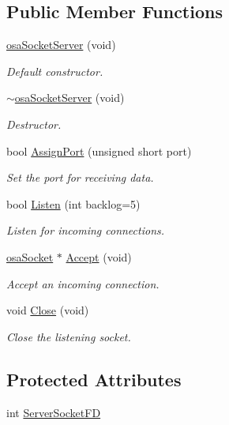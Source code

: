 \subsection*{Public Member Functions}
\begin{DoxyCompactItemize}
\item 
\hyperlink{classosa_socket_server_a95442e75d0234966550256b8591fca55}{osa\-Socket\-Server} (void)
\begin{DoxyCompactList}\small\item\em Default constructor. \end{DoxyCompactList}\item 
\hyperlink{classosa_socket_server_a0e5b5e34967cd0bfe3ee80ba98f62fe5}{$\sim$osa\-Socket\-Server} (void)
\begin{DoxyCompactList}\small\item\em Destructor. \end{DoxyCompactList}\item 
bool \hyperlink{classosa_socket_server_a983f8c04e9683324095f6440d022e7fb}{Assign\-Port} (unsigned short port)
\begin{DoxyCompactList}\small\item\em Set the port for receiving data. \end{DoxyCompactList}\item 
bool \hyperlink{classosa_socket_server_a8a9d065ea83b82acdce8568d0e87610a}{Listen} (int backlog=5)
\begin{DoxyCompactList}\small\item\em Listen for incoming connections. \end{DoxyCompactList}\item 
\hyperlink{classosa_socket}{osa\-Socket} $\ast$ \hyperlink{classosa_socket_server_afb7c054b984fe086617dd17b65b20979}{Accept} (void)
\begin{DoxyCompactList}\small\item\em Accept an incoming connection. \end{DoxyCompactList}\item 
void \hyperlink{classosa_socket_server_aa3540c4c8fccdddde8b1b922bbb4dbba}{Close} (void)
\begin{DoxyCompactList}\small\item\em Close the listening socket. \end{DoxyCompactList}\end{DoxyCompactItemize}
\subsection*{Protected Attributes}
\begin{DoxyCompactItemize}
\item 
int \hyperlink{classosa_socket_server_ad540b1c7de4c8d402ea98c937a7d8832}{Server\-Socket\-F\-D}
\end{DoxyCompactItemize}


